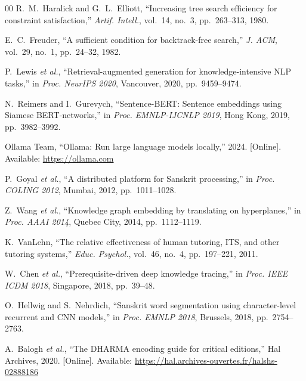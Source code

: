 \documentclass[conference]{IEEEtran}
\begin{document}
\begin{thebibliography}{00}
R.~M.~Haralick and G.~L.~Elliott,
``Increasing tree search efficiency for constraint satisfaction,''
\textit{Artif. Intell.}, vol.~14, no.~3, pp.~263--313, 1980.

E.~C.~Freuder,
``A sufficient condition for backtrack-free search,''
\textit{J. ACM}, vol.~29, no.~1, pp.~24--32, 1982.

P.~Lewis \textit{et al.},
``Retrieval-augmented generation for knowledge-intensive NLP tasks,''
in \textit{Proc. NeurIPS 2020}, Vancouver, 2020, pp.~9459--9474.

N.~Reimers and I.~Gurevych,
``Sentence-BERT: Sentence embeddings using Siamese BERT-networks,''
in \textit{Proc. EMNLP-IJCNLP 2019}, Hong Kong, 2019, pp.~3982--3992.

Ollama Team,
``Ollama: Run large language models locally,''
2024. [Online]. Available: \url{https://ollama.com}

P.~Goyal \textit{et al.},
``A distributed platform for Sanskrit processing,''
in \textit{Proc. COLING 2012}, Mumbai, 2012, pp.~1011--1028.

Z.~Wang \textit{et al.},
``Knowledge graph embedding by translating on hyperplanes,''
in \textit{Proc. AAAI 2014}, Quebec City, 2014, pp.~1112--1119.

K.~VanLehn,
``The relative effectiveness of human tutoring, ITS, and other tutoring systems,''
\textit{Educ. Psychol.}, vol.~46, no.~4, pp.~197--221, 2011.

W.~Chen \textit{et al.},
``Prerequisite-driven deep knowledge tracing,''
in \textit{Proc. IEEE ICDM 2018}, Singapore, 2018, pp.~39--48.

O.~Hellwig and S.~Nehrdich,
``Sanskrit word segmentation using character-level recurrent and CNN models,''
in \textit{Proc. EMNLP 2018}, Brussels, 2018, pp.~2754--2763.

A.~Balogh \textit{et al.},
``The DHARMA encoding guide for critical editions,''
Hal Archives, 2020.
[Online]. Available: \url{https://hal.archives-ouvertes.fr/halshs-02888186}

\end{thebibliography}

\appendices
\end{document}
